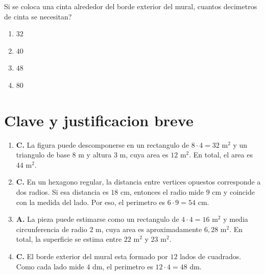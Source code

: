 \documentclass[12pt]{article}
\begin{document}
\begin{enumerate}[label=\textbf{\arabic*.}, itemsep=1.05cm]
\begin{center}
\end{center}

Si se coloca una cinta alrededor del borde exterior del mural, \textquestiondown cuantos decimetros de cinta se necesitan?

\begin{enumerate}[label=\Alph*)]
  \item $32$
  \item $40$
  \item $48$
  \item $80$
\end{enumerate}

\end{enumerate}

\section*{Clave y justificacion breve}

\begin{enumerate}[label=\textbf{\arabic*.}]
  \item \textbf{C.} La figura puede descomponerse en un rectangulo de $8\cdot 4=32$ m$^2$ y un triangulo de base $8$ m y altura $3$ m, cuya area es $12$ m$^2$. En total, el area es $44$ m$^2$.
  \item \textbf{C.} En un hexagono regular, la distancia entre vertices opuestos corresponde a dos radios. Si esa distancia es $18$ cm, entonces el radio mide $9$ cm y coincide con la medida del lado. Por eso, el perimetro es $6\cdot 9=54$ cm.
  \item \textbf{A.} La pieza puede estimarse como un rectangulo de $4\cdot 4=16$ m$^2$ y media circunferencia de radio $2$ m, cuya area es aproximadamente $6,28$ m$^2$. En total, la superficie se estima entre $22$ m$^2$ y $23$ m$^2$.
  \item \textbf{C.} El borde exterior del mural esta formado por $12$ lados de cuadrados. Como cada lado mide $4$ dm, el perimetro es $12\cdot 4=48$ dm.
\end{enumerate}
\end{document}

